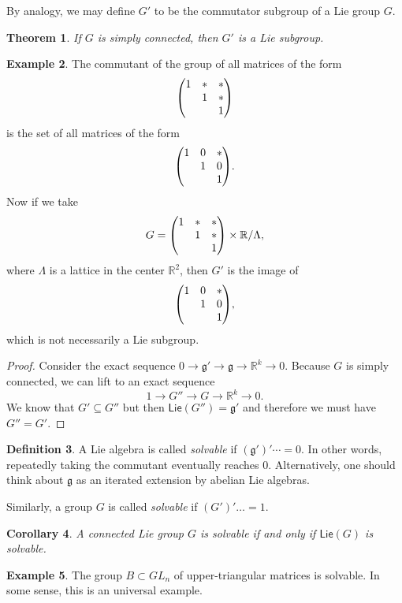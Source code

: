 \documentclass[leqno, openany]{memoir}
\newtheorem{thm}{Theorem}[section]
\newtheorem{cor}[thm]{Corollary}
\theoremstyle{definition}
\newtheorem{defn}[thm]{Definition}
\newtheorem{exm}[thm]{Example}
\theoremstyle{remark}
\theoremstyle{plain}
\theoremstyle{definition}
\theoremstyle{remark}
\newcommand{\R}{\mathbb{R}}
\newcommand{\mf}[1]{\mathfrak{#1}}
\newcommand{\ms}[1]{\mathsf{#1}}
\begin{document}
By analogy, we may define $G'$ to be the commutator subgroup of a Lie group
$G$.

\begin{thm} If $G$ is simply connected, then $G'$ is a Lie subgroup.  \end{thm}

\begin{exm} The commutant of the group of all matrices of the form \[ \mqty( 1
& * & * \\ & 1 & * \\ & & 1 ) \] is the set of all matrices of the form \[
\mqty( 1 & 0 & * \\ & 1 & 0 \\ & & 1 ). \] Now if we take \[ G = \mqty( 1 & * &
* \\ & 1 & * \\ & & 1 ) \times \R / \Lambda, \] where $\Lambda$ is a lattice in
the center $\R^2$, then $G'$ is the image of \[ \mqty( 1 & 0 & * \\ & 1 & 0 \\
& & 1 ), \] which is not necessarily a Lie subgroup.  \end{exm}

\begin{proof} Consider the exact sequence $0 \to \mf{g}' \to \mf{g} \to \R^k
    \to 0$. Because $G$ is simply connected, we can lift to an exact sequence
    \[ 1 \to G'' \to G \to \R^k \to 0. \] We know that $G' \subseteq G''$ but
    then $\ms{Lie}(G'') = \mf{g}'$ and therefore we must have $G'' = G'$.
\end{proof}

\begin{defn} A Lie algebra is called \textit{solvable} if $(\mf{g}')'\cdots =
    0$. In other words, repeatedly taking the commutant eventually reaches $0$.
    Alternatively, one should think about $\mf{g}$ as an iterated extension by
    abelian Lie algebras.  \end{defn}

Similarly, a group $G$ is called \textit{solvable} if $(G')' \ldots = 1$. 

\begin{cor} A connected Lie group $G$ is solvable if and only if $\ms{Lie}(G)$
is solvable.  \end{cor}

\begin{exm} The group $B \subset GL_n$ of upper-triangular matrices is
solvable. In some sense, this is an universal example.  \end{exm}
\end{document}
